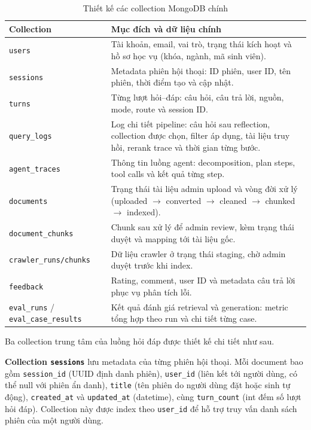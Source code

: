 \documentclass[../DoAn.tex]{subfiles}
\begin{document}
\begin{table}[H]
\centering
\small
\begin{tabular}{|p{3.6cm}|p{10.0cm}|}
\hline
\textbf{Collection} & \textbf{Mục đích và dữ liệu chính} \\
\hline
\texttt{users} & Tài khoản, email, vai trò, trạng thái kích hoạt và hồ sơ
học vụ (khóa, ngành, mã sinh viên). \\
\hline
\texttt{sessions} & Metadata phiên hội thoại: ID phiên, user ID, tên phiên,
thời điểm tạo và cập nhật. \\
\hline
\texttt{turns} & Từng lượt hỏi--đáp: câu hỏi, câu trả lời, nguồn, mode,
route và session ID. \\
\hline
\texttt{query\_logs} & Log chi tiết pipeline: câu hỏi sau reflection, collection
được chọn, filter áp dụng, tài liệu truy hồi, rerank trace và thời gian từng
bước. \\
\hline
\texttt{agent\_traces} & Thông tin luồng agent: decomposition, plan steps,
tool calls và kết quả từng step. \\
\hline
\texttt{documents} & Trạng thái tài liệu admin upload và vòng đời xử lý
(uploaded $\to$ converted $\to$ cleaned $\to$ chunked $\to$ indexed). \\
\hline
\texttt{document\_chunks} & Chunk sau xử lý để admin review, kèm trạng thái
duyệt và mapping tới tài liệu gốc. \\
\hline
\texttt{crawler\_runs/chunks} & Dữ liệu crawler ở trạng thái staging, chờ
admin duyệt trước khi index. \\
\hline
\texttt{feedback} & Rating, comment, user ID và metadata câu trả lời phục vụ
phân tích lỗi. \\
\hline
\texttt{eval\_runs} / \texttt{eval\_case\_results} & Kết quả đánh giá retrieval
và generation: metric tổng hợp theo run và chi tiết từng case. \\
\hline
\end{tabular}
\caption{Thiết kế các collection MongoDB chính}
\label{tab:ch4-mongo}
\end{table}

Ba collection trung tâm của luồng hỏi đáp được thiết kế chi tiết như sau.

\textbf{Collection \texttt{sessions}} lưu metadata của từng phiên hội thoại.
Mỗi document bao gồm \texttt{session\_id} (UUID định danh phiên),
\texttt{user\_id} (liên kết tới người dùng, có thể null với phiên ẩn danh),
\texttt{title} (tên phiên do người dùng đặt hoặc sinh tự động),
\texttt{created\_at} và \texttt{updated\_at} (datetime), cùng
\texttt{turn\_count} (int đếm số lượt hỏi đáp). Collection này được index theo
\texttt{user\_id} để hỗ trợ truy vấn danh sách phiên của một người dùng.
\end{document}
